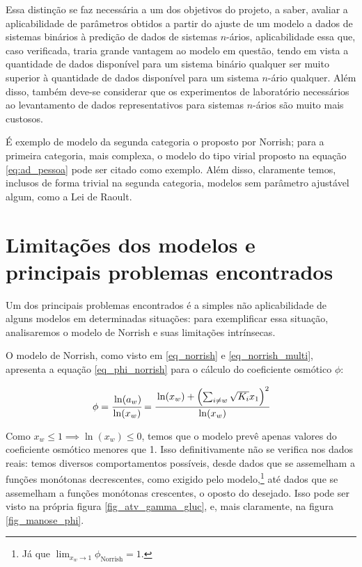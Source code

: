 \documentclass[
	12pt,				%
	openright,
	twoside,
	a4paper,			%
	english,			%
	french,				%
	spanish,			%
	brazil				%
	]{abntex2}
\begin{document}
Essa distinção se faz necessária a um dos objetivos do projeto, a saber, avaliar
a aplicabilidade de parâmetros obtidos a partir do ajuste de um modelo a dados
de sistemas binários à predição de dados de sistemas $n$-ários, aplicabilidade
essa que, caso verificada, traria grande vantagem ao modelo em questão, tendo em
vista a quantidade de dados disponível para um sistema binário qualquer
ser muito superior à quantidade de dados disponível para um sistema $n$-ário
qualquer. Além disso, também deve-se considerar que os experimentos de
laboratório necessários ao levantamento de dados representativos para sistemas
$n$-ários são muito mais custosos.

É exemplo de modelo da segunda categoria o proposto por Norrish; para a
primeira categoria, mais complexa, o modelo do tipo virial proposto na equação
\ref{eq:ad_pessoa} pode ser citado como exemplo. Além disso, claramente temos,
inclusos de forma trivial na segunda categoria, modelos sem parâmetro ajustável
algum, como a Lei de Raoult.

\section{Limitações dos modelos e principais problemas encontrados}

Um dos principais problemas encontrados é a simples não aplicabilidade de
alguns modelos em determinadas situações: para exemplificar essa situação,
analisaremos o modelo de Norrish e suas limitações intrínsecas.

O modelo de Norrish, como visto em \ref{eq_norrish} e \ref{eq_norrish_multi},
apresenta a equação \ref{eq_phi_norrish} para o cálculo do coeficiente
osmótico $\phi$:

\begin{equation}
	\label{eq_phi_norrish}
	\phi = \cfrac{\ln(a_w)}{\ln(x_w)} = \cfrac{\ln(x_w) + \left(\sum_{ i\neq w}
	\sqrt{K_i}x_1\right)^2}{\ln(x_w)}
\end{equation}

Como $x_w \le 1 \implies \ln(x_w) \le 0$, temos que o modelo prevê apenas
valores do coeficiente osmótico menores que 1. Isso definitivamente não se
verifica nos dados reais: temos diversos comportamentos possíveis, desde
dados que se assemelham a funções monótonas decrescentes, como exigido pelo
modelo,\footnote{%
	Já que $\lim_{x_w \to 1}\phi_\text{Norrish} = 1$.
} até dados que se assemelham a funções monótonas crescentes, o oposto do
desejado. Isso pode ser visto na própria figura \ref{fig_atv_gamma_gluc}, e,
mais claramente, na figura \ref{fig_manose_phi}.
\end{document}
